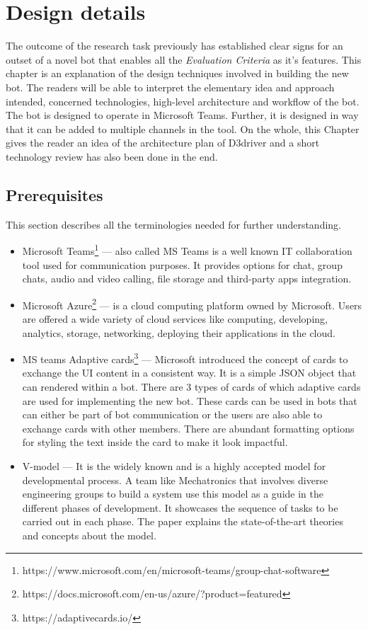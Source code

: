 \chapter{Design details}
\label{chap: dt}
The outcome of the research task previously has established clear signs for an outset of a novel bot that enables all the \textit{Evaluation Criteria} as it's features. This chapter is an explanation of the design techniques involved in building the new bot. The readers will be able to interpret the elementary idea and approach intended, concerned technologies, high-level architecture and workflow of the bot. The bot is designed to operate in Microsoft Teams. Further, it is designed in way that it can be added to multiple channels in the tool. On the whole, this Chapter gives the reader an idea of the architecture plan of D3driver and a short technology review has also been done in the end.

\section{Prerequisites}
This section describes all the terminologies needed for further understanding.
\begin{itemize}
\item Microsoft Teams\footnote{https://www.microsoft.com/en/microsoft-teams/group-chat-software} --- also called MS Teams is a well known IT collaboration tool used for communication purposes. It provides options for chat, group chats, audio and video calling, file storage and third-party apps integration. 

\item Microsoft Azure\footnote{https://docs.microsoft.com/en-us/azure/?product=featured} --- is a cloud computing platform owned by Microsoft. Users are offered a wide variety of cloud services like computing, developing, analytics, storage, networking, deploying their applications in the cloud. 

\item MS teams Adaptive cards\footnote{https://adaptivecards.io/} --- Microsoft introduced the concept of cards to exchange the UI content in a consistent way. It is a simple JSON object that can rendered within a bot. There are 3 types of cards of which adaptive cards are used for implementing the new bot. These cards can be used in bots that can either be part of bot communication or the users are also able to exchange cards with other members. There are abundant formatting options for styling the text inside the card to make it look impactful.

\item V-model --- It is the widely known and is a highly accepted model for developmental process. A team like Mechatronics that involves diverse engineering groups to build a system use this model as a guide in the different phases of development. It showcases the sequence of tasks to be carried out in each phase. The paper \cite{grassler2018v} explains the state-of-the-art theories and concepts about the model.

\end{itemize}

